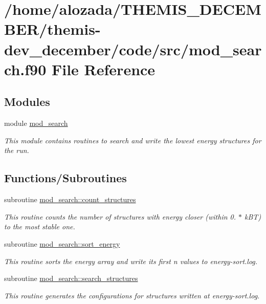 \hypertarget{mod__search_8f90}{}\section{/home/alozada/\+T\+H\+E\+M\+I\+S\+\_\+\+D\+E\+C\+E\+M\+B\+E\+R/themis-\/dev\+\_\+december/code/src/mod\+\_\+search.f90 File Reference}
\label{mod__search_8f90}
\subsection*{Modules}
\begin{DoxyCompactItemize}
\item 
module \hyperlink{namespacemod__search}{mod\+\_\+search}
\begin{DoxyCompactList}\small\item\em This module contains routines to search and write the lowest energy structures for the run. \end{DoxyCompactList}\end{DoxyCompactItemize}
\subsection*{Functions/\+Subroutines}
\begin{DoxyCompactItemize}
\item 
subroutine \hyperlink{namespacemod__search_a5026804a4e265b1a450eebc86cd81575}{mod\+\_\+search\+::count\+\_\+structures}
\begin{DoxyCompactList}\small\item\em This routine counts the number of structures with energy closer (within 0. $\ast$ k\+BT) to the most stable one. \end{DoxyCompactList}\item 
subroutine \hyperlink{namespacemod__search_a55e1f850472fe6cef190a6838ae61e51}{mod\+\_\+search\+::sort\+\_\+energy}
\begin{DoxyCompactList}\small\item\em This routine sorts the energy array and write its first n values to energy-\/sort.\+log. \end{DoxyCompactList}\item 
subroutine \hyperlink{namespacemod__search_ac11978e9ebdb6b101a09555f4742a4c9}{mod\+\_\+search\+::search\+\_\+structures}
\begin{DoxyCompactList}\small\item\em This routine generates the configurations for structures written at energy-\/sort.\+log. \end{DoxyCompactList}\end{DoxyCompactItemize}
